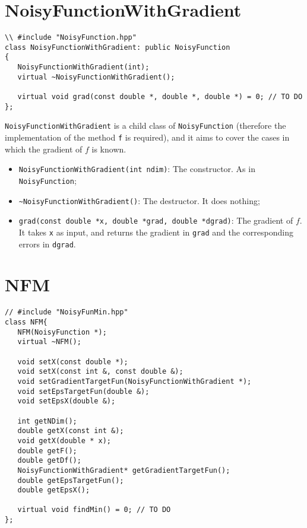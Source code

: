 \documentclass[11pt,a4paper,twoside]{article}
\begin{document}



\section{NoisyFunctionWithGradient} %
\label{sec:NoisyFunctionWithGradient}

\begin{lstlisting}
\\ #include "NoisyFunction.hpp"
class NoisyFunctionWithGradient: public NoisyFunction
{
   NoisyFunctionWithGradient(int);
   virtual ~NoisyFunctionWithGradient();

   virtual void grad(const double *, double *, double *) = 0; // TO DO
};
\end{lstlisting}

\verb+NoisyFunctionWithGradient+ is a child class of \verb+NoisyFunction+ (therefore the implementation of the method \verb+f+ is required), and it aims to cover the cases in which the gradient of $f$ is known.

\begin{itemize}
\item \verb+NoisyFunctionWithGradient(int ndim)+: The constructor. As in \verb+NoisyFunction+;
\item \verb+~NoisyFunctionWithGradient()+: The destructor. It does nothing;
\item \verb+grad(const double *x, double *grad, double *dgrad)+: The gradient of $f$. It takes \verb+x+ as input, and returns the gradient in \verb+grad+ and the corresponding errors in \verb+dgrad+.
\end{itemize}




\section{NFM} %
\label{sec:nfm}

\begin{lstlisting}
// #include "NoisyFunMin.hpp"
class NFM{
   NFM(NoisyFunction *);
   virtual ~NFM();

   void setX(const double *);
   void setX(const int &, const double &);
   void setGradientTargetFun(NoisyFunctionWithGradient *);
   void setEpsTargetFun(double &);
   void setEpsX(double &);

   int getNDim();
   double getX(const int &);
   void getX(double * x);
   double getF();
   double getDf();
   NoisyFunctionWithGradient* getGradientTargetFun();
   double getEpsTargetFun();
   double getEpsX();

   virtual void findMin() = 0; // TO DO
};

\end{lstlisting}
\end{document}

